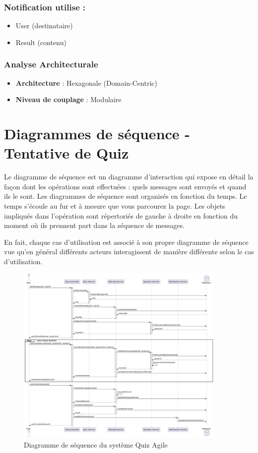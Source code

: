 \documentclass[12pt,a4paper]{report}
\begin{document}
\subsubsection{Notification utilise :}
\begin{itemize}
\item User (destinataire)
\item Result (contenu)
\end{itemize}

\subsubsection{Analyse Architecturale}
\begin{itemize}
\item \textbf{Architecture} : Hexagonale (Domain-Centric)
\item \textbf{Niveau de couplage} : Modulaire
\end{itemize}

\section{Diagrammes de séquence - Tentative de Quiz}

Le diagramme de séquence est un diagramme d'interaction qui expose en détail la façon dont les opérations sont effectuées : quels messages sont envoyés et quand ils le sont. Les diagrammes de séquence sont organisés en fonction du temps. Le temps s'écoule au fur et à mesure que vous parcourez la page. Les objets impliqués dans l'opération sont répertoriés de gauche à droite en fonction du moment où ils prennent part dans la séquence de messages.

En fait, chaque cas d'utilisation est associé à son propre diagramme de séquence vue qu'en général différents acteurs interagissent de manière différente selon le cas d'utilisation.

\begin{figure}[H]
\centering
\includegraphics[width=0.9\textwidth]{latex_media/media/image19.png}
\caption{Diagramme de séquence du système Quiz Agile}
\label{fig:diagramme-sequence}
\end{figure}
\end{document}
